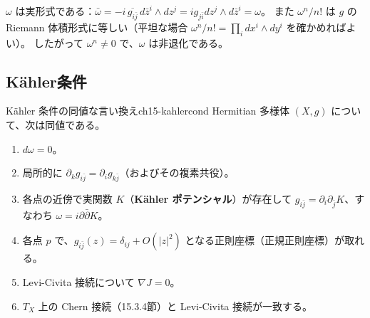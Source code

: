 $\omega$ は実形式である：$\bar\omega = -i\,\overline{g_{i\bar j}}\,d\bar z^i\wedge dz^j = i g_{j\bar i}dz^j\wedge d\bar z^i = \omega$。
また $\omega^n/n!$ は $g$ の Riemann 体積形式に等しい（平坦な場合 $\omega^n/n! = \prod_i dx^i\wedge dy^i$ を確かめればよい）。
したがって $\omega^n \neq 0$ で、$\omega$ は非退化である。

\subsection{K\"ahler条件}

\begin{mythm}{K\"ahler 条件の同値な言い換え}{ch15-kahlercond}
Hermitian 多様体 $(X,g)$ について、次は同値である。
\begin{enumerate}
\item $d\omega = 0$。
\item 局所的に $\partial_k g_{i\bar j} = \partial_i g_{k\bar j}$（およびその複素共役）。
\item 各点の近傍で実関数 $K$（\textbf{K\"ahler ポテンシャル}）が存在して $g_{i\bar j} = \partial_i\partial_{\bar j}K$、すなわち $\omega = i\partial\bar\partial K$。
\item 各点 $p$ で、$g_{i\bar j}(z) = \delta_{ij} + O(|z|^2)$ となる正則座標（正規正則座標）が取れる。
\item Levi-Civita 接続について $\nabla J = 0$。
\item $T_X$ 上の Chern 接続（15.3.4節）と Levi-Civita 接続が一致する。
\end{enumerate}
\end{mythm}

